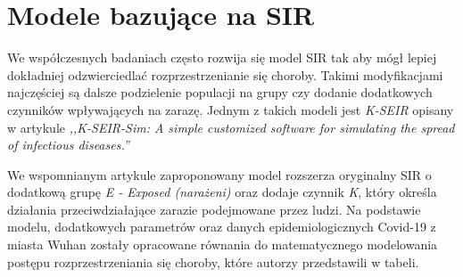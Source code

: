\section{\textbf{Modele bazujące na SIR}}

We współczesnych badaniach często rozwija się model SIR tak aby mógł lepiej dokładniej odzwierciedlać rozprzestrzenianie się choroby. Takimi modyfikacjami najczęściej są dalsze podzielenie populacji na grupy czy dodanie dodatkowych czynników wpływających na zarazę. Jednym z takich modeli jest \textit {K-SEIR} opisany w artykule \textit {,,K-SEIR-Sim: A simple customized software for simulating the spread of infectious diseases.''
\cite{bib:artykul}} 

We wspomnianym artykule zaproponowany model rozszerza oryginalny SIR o dodatkową grupę \textit { E - Exposed (narażeni)} oraz dodaje czynnik \textit {K}, który określa działania przeciwdziałające zarazie podejmowane przez ludzi. Na podstawie modelu, dodatkowych parametrów oraz danych epidemiologicznych Covid-19 z miasta Wuhan zostały opracowane równania do matematycznego modelowania postępu rozprzestrzeniania się choroby, które autorzy przedstawili w tabeli.

